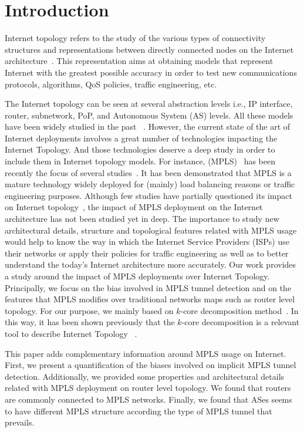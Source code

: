 \section{Introduction}\label{intro}
Internet topology refers to the study of the various types of
connectivity structures and representations between directly connected nodes on
the Internet architecture~\cite{Calvert97}. This representation aims at
obtaining models that represent  Internet with the greatest possible accuracy in order
to test new communications protocols, algorithms, QoS policies, traffic
engineering, etc.

The Internet topology can be seen at several abstraction levels i.e., IP
interface, router, subnetwork, PoP, and Autonomous System (AS) levels. All these
models have been widely studied in the past~\cite{DONNET13} . However, the
current state of the art of Internet deployments involves a great number of
technologies impacting the Internet Topology.  And those technologies deserve a
deep study in order to include them in Internet topology models.  For instance, 
 (MPLS)~\cite{rfc3031} has been recently the
focus of several studies~\cite{SOM11,DONNET13,Vanaubel15}.  It has been
demonstrated that MPLS is a mature technology widely deployed for (mainly) load
balancing reasons or traffic engineering purposes.  Although few studies have
partially questioned its impact on Internet topology~\cite{BRICE07,Flach2012}, the impact of MPLS deployment on the Internet architecture has not been
studied yet in deep. The importance to study new architectural details, structure and topological
features related with MPLS usage would help to know the way in
which the Internet Service Providers (ISPs) use their networks or apply their
policies for traffic engineering as well as to better understand the today's
Internet architecture more accurately. Our work provides a study around the
impact of MPLS deployments over Internet Topology. Principally, we focus on the
bias involved in MPLS tunnel detection and on the features that MPLS modifies over traditional networks maps such as router level topology. For our purpose, we mainly based on  $k$-core
decomposition method~\cite{batagelj2002}. In this way, it has been shown
previously that the $k$-core decomposition is a relevant tool to describe
Internet Topology ~\cite{Alvarez06k, Serrano06, Serrano06, Alvarez08k}.

This paper adds complementary information around MPLS
usage on Internet. First, we present a quantification of the biases involved on
implicit MPLS tunnel detection. Additionally, we provided some properties and
architectural details related with MPLS deployment on router level topology. We found
that routers are commonly connected to  MPLS
networks. Finally, we found that ASes seems to have different MPLS structure 
according the type of MPLS tunnel that prevails.


